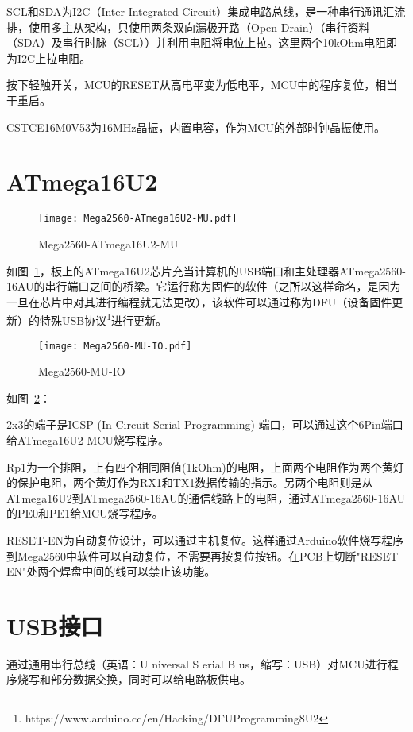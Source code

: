 SCL和SDA为I2C（Inter-Integrated Circuit）集成电路总线，是一种串行通讯汇流排，使用多主从架构，只使用两条双向漏极开路（Open Drain）（串行资料（SDA）及串行时脉（SCL））并利用电阻将电位上拉。这里两个10kOhm电阻即为I2C上拉电阻。

按下轻触开关，MCU的RESET从高电平变为低电平，MCU中的程序复位，相当于重启。

CSTCE16M0V53为16MHz晶振，内置电容，作为MCU的外部时钟晶振使用。

\section{ATmega16U2}

\begin{figure}[htbp]
    \centering
    \texttt{[image: Mega2560-ATmega16U2-MU.pdf]}
    \caption{Mega2560-ATmega16U2-MU}
    \label{fig:Mega2560-ATmega16U2-MU}
\end{figure}

如图~\ref{fig:Mega2560-ATmega16U2-MU}，板上的ATmega16U2芯片充当计算机的USB端口和主处理器ATmega2560-16AU的串行端口之间的桥梁。它运行称为固件的软件（之所以这样命名，是因为一旦在芯片中对其进行编程就无法更改），该软件可以通过称为DFU（设备固件更新）的特殊USB协议\footnote{https://www.arduino.cc/en/Hacking/DFUProgramming8U2}进行更新。

\begin{figure}[htbp]
    \centering
    \texttt{[image: Mega2560-MU-IO.pdf]}
    \caption{Mega2560-MU-IO}
    \label{fig:Mega2560-MU-IO}
\end{figure}

如图~\ref{fig:Mega2560-MU-IO}：

2x3的端子是ICSP (In-Circuit Serial Programming) 端口，可以通过这个6Pin端口给ATmega16U2 MCU烧写程序。

Rp1为一个排阻，上有四个相同阻值(1kOhm)的电阻，上面两个电阻作为两个黄灯的保护电阻，两个黄灯作为RX1和TX1数据传输的指示。另两个电阻则是从ATmega16U2到ATmega2560-16AU的通信线路上的电阻，通过ATmega2560-16AU的PE0和PE1给MCU烧写程序。

RESET-EN为自动复位设计，可以通过主机复位。这样通过Arduino软件烧写程序到Mega2560中软件可以自动复位，不需要再按复位按钮。在PCB上切断"RESET EN"处两个焊盘中间的线可以禁止该功能。

\section{USB接口}

通过通用串行总线（英语：U niversal S erial B us，缩写：USB）对MCU进行程序烧写和部分数据交换，同时可以给电路板供电。

